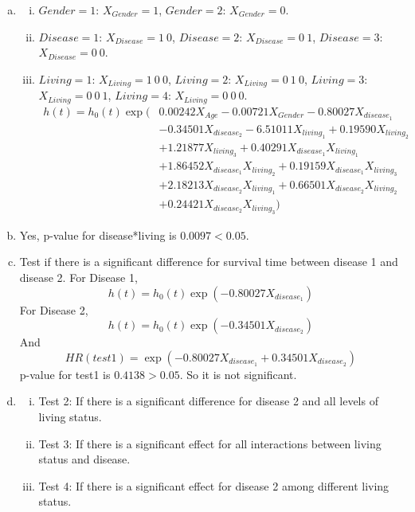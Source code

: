 \documentclass{elegantbook}
\begin{document}
\begin{solution}
    \begin{enumerate}[a)]
        \item \begin{enumerate}[i)]
            \item $Gender = 1$: $X_{Gender} = 1$, $Gender = 2$: $X_{Gender} = 0$. 
            \item $Disease = 1$: $X_{Disease} = 1\ 0$, $Disease = 2$: $X_{Disease} = 0\ 1$, $Disease = 3$: $X_{Disease} = 0\ 0$. 
            \item $Living = 1$: $X_{Living} = 1\ 0\ 0$, $Living = 2$: $X_{Living} = 0\ 1\ 0$, $Living = 3$: $X_{Living} = 0\ 0\ 1$, $Living = 4$: $X_{Living} = 0\ 0\ 0$. 
            \begin{align*}
                h(t)=h_0(t)\exp(&0.00242X_{Age} -0.00721X_{Gender}-0.80027 X_{disease_1}\\
                &-0.34501 X_{disease_2}-6.51011X_{living_1}+0.19590 X_{living_2}\\
                &+1.21877 X_{living_3}+0.40291 X_{disease_1}X_{living_1}\\
                &+1.86452X_{disease_1}X_{living_2}+0.19159 X_{disease_1}X_{living_3}\\
                &+2.18213 X_{disease_2}X_{living_1}+0.66501X_{disease_2}X_{living_2}\\
                &+0.24421 X_{disease_2}X_{living_3})
            \end{align*}
        \end{enumerate}
        \item Yes, p-value for disease*living is $0.0097<0.05$. 
        \item Test if there is a significant difference for survival time between disease 1 and disease 2. For Disease 1, 
        \[h(t)= h_0(t)\exp(-0.80027 X_{disease_1})\]
        For Disease 2, 
        \[h(t)= h_0(t)\exp(-0.34501 X_{disease_2})\]
        And 
        \[HR(test1)=\exp(-0.80027 X_{disease_1}+0.34501 X_{disease_2})\]
        p-value for test1 is $0.4138>0.05$. So it is not significant. 
        \item \begin{enumerate}[i)]
            \item Test 2: If there is a significant difference for disease 2 and all levels of living status.
            \item Test 3: If there is a significant effect for all interactions between living status and disease. 
            \item Test 4: If there is a significant effect for disease 2 among different living status.
        \end{enumerate}
    \end{enumerate}
\end{solution}
\end{document}
